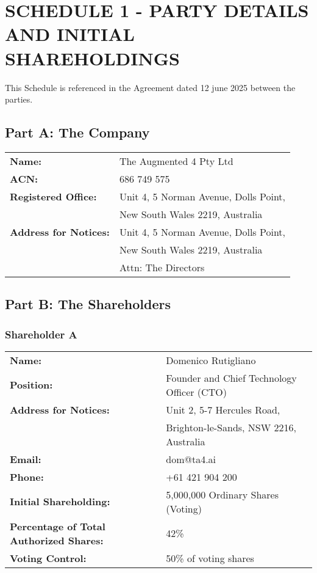 \section*{SCHEDULE 1 - PARTY DETAILS AND INITIAL SHAREHOLDINGS}

This Schedule is referenced in the Agreement dated 12 june 2025 between the parties.

\subsection*{Part A: The Company}
\begin{tabularx}{\textwidth}{@{} l X @{}}
\textbf{Name:} & The Augmented 4 Pty Ltd \\
\textbf{ACN:} & 686 749 575 \\
\textbf{Registered Office:} & Unit 4, 5 Norman Avenue, Dolls Point, \\
& New South Wales 2219, Australia \\
\textbf{Address for Notices:} & Unit 4, 5 Norman Avenue, Dolls Point, \\
& New South Wales 2219, Australia \\
& Attn: The Directors
\end{tabularx}

\vspace{1em}

\subsection*{Part B: The Shareholders}

\subsubsection*{Shareholder A}
\begin{tabularx}{\textwidth}{@{} l X @{}}
\textbf{Name:} & Domenico Rutigliano \\
\textbf{Position:} & Founder and Chief Technology Officer (CTO) \\
\textbf{Address for Notices:} & Unit 2, 5-7 Hercules Road, \\
& Brighton-le-Sands, NSW 2216, Australia \\
\textbf{Email:} & dom@ta4.ai \\
\textbf{Phone:} & +61 421 904 200 \\
\textbf{Initial Shareholding:} & 5,000,000 Ordinary Shares (Voting) \\
\textbf{Percentage of Total Authorized Shares:} & 42\% \\
\textbf{Voting Control:} & 50\% of voting shares
\end{tabularx}

